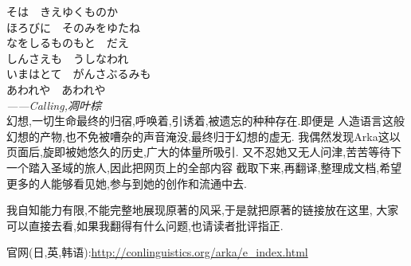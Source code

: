 \noindent そは　きえゆくものか\\
ほろびに　そのみをゆたね\\
なをしるものもと　だえ\\
しんさえも　うしなわれ\\
いまはとて　がんさぶるみも\\
あわれや　あわれや\\

\textit{------Calling,凋叶棕}\\

幻想,一切生命最终的归宿,呼唤着,引诱着,被遗忘的种种存在.即便是
人造语言这般幻想的产物,也不免被嘈杂的声音淹没,最终归于幻想的虚无.
我偶然发现Arka这以页面后,旋即被她悠久的历史,广大的体量所吸引.
又不忍她又无人问津,苦苦等待下一个踏入圣域的旅人,因此把网页上的全部内容
截取下来,再翻译,整理成文档,希望更多的人能够看见她,参与到她的创作和流通中去.

我自知能力有限,不能完整地展现原著的风采,于是就把原著的链接放在这里,
大家可以直接去看,如果我翻得有什么问题,也请读者批评指正.

官网(日,英,韩语):\url{http://conlinguistics.org/arka/e\_index.html}